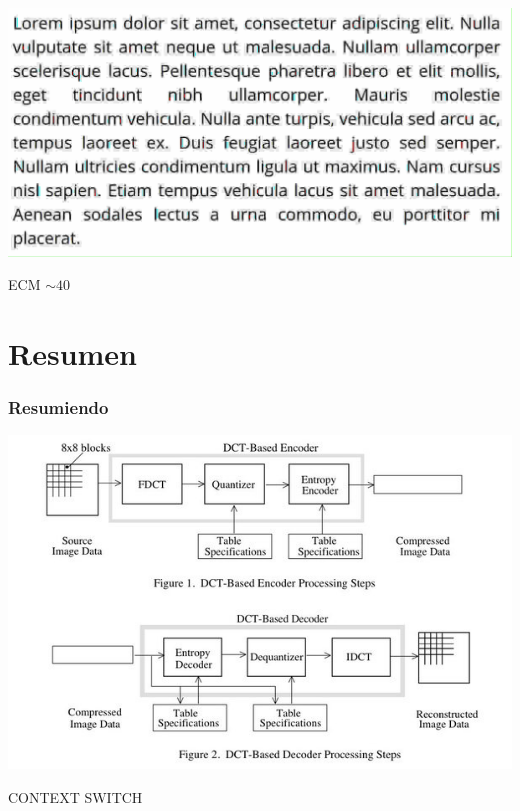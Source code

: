 \documentclass{beamer}
\begin{document}
\begin{frame}
    \begin{center}
        \includegraphics[scale=0.2]{fig/txt_80.png}


        \vfill
        {\small ECM $\sim 40$}

    \end{center}

\end{frame}


\section{Resumen}
\begin{frame}
    \frametitle{Resumiendo}
    \begin{center}
        \includegraphics[scale=0.45]{fig/steps.jpeg}
    \end{center}
\end{frame}

\begin{frame}
    \begin{center}
        CONTEXT SWITCH
    \end{center}
\end{frame}
\end{document}
